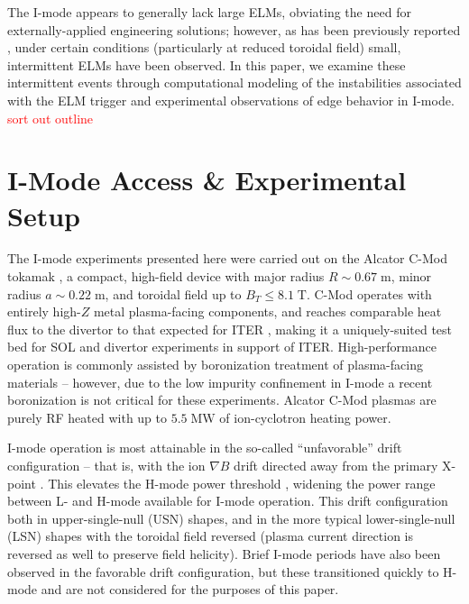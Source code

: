 \documentclass[12pt,floatfix,showpacs]{revtex4-1}
\newcommand{\note}[1]{\textcolor{red}{#1}}
\newcommand{\gnote}[1]{\marginpar{\textcolor{red}{\scriptsize{#1}}}}
\begin{document}
The I-mode appears to generally lack large ELMs, obviating the need for externally-applied engineering solutions; however, as has been previously reported \cite{Whyte2010,Walk2014,Walk2014b}, under certain conditions (particularly at reduced toroidal field) small, intermittent ELMs have been observed.
In this paper, we examine these intermittent events through computational modeling of the instabilities associated with the ELM trigger and experimental observations of edge behavior in I-mode.  \note{sort out outline}

\section{I-Mode Access \& Experimental Setup}\label{sec:setup}

The I-mode experiments presented here were carried out on the Alcator C-Mod tokamak \cite{Hutchinson1994}, a compact, high-field device with major radius $R \sim 0.67 \;\mbox{m}$, minor radius $a \sim 0.22 \;\mbox{m}$, and toroidal field up to $B_T \le 8.1 \;\mbox{T}$.  
C-Mod operates with entirely high-$Z$ metal plasma-facing components, and reaches comparable heat flux to the divertor to that expected for ITER \cite{Loarte2007,Terry2007,LaBombard2011}, making it a uniquely-suited test bed for SOL and divertor experiments in support of ITER\gnote{too much?}.  
High-performance operation is commonly assisted by boronization treatment of plasma-facing materials -- however, due to the low impurity confinement in I-mode a recent boronization is not critical for these experiments.  
Alcator C-Mod plasmas are purely RF heated with up to $5.5 \;\mbox{MW}$ of ion-cyclotron heating power.

I-mode operation is most attainable in the so-called ``unfavorable'' drift configuration -- that is, with the ion $\nabla B$ drift directed away from the primary X-point \cite{Whyte2010}.  
This elevates the H-mode power threshold \cite{Hubbard2007}, widening the power range between L- and H-mode available for I-mode operation.  
This drift configuration both in upper-single-null (USN) shapes, and in the more typical lower-single-null (LSN) shapes with the toroidal field reversed (plasma current direction is reversed as well to preserve field helicity)\gnote{clarify?}.  
Brief I-mode periods have also been observed in the favorable drift configuration, but these transitioned quickly to H-mode and are not considered for the purposes of this paper.
\end{document}
